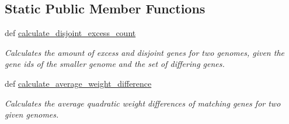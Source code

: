 \subsection*{Static Public Member Functions}
\begin{DoxyCompactItemize}
\item 
def \hyperlink{classNEAT__PyGenetics_1_1NEAT_1_1Analyst_1_1GenomeClusterer_1_1GenomeClusterer_a25f21d57d135bbf3b0f23bbfdef375e7}{calculate\+\_\+disjoint\+\_\+excess\+\_\+count}
\begin{DoxyCompactList}\small\item\em Calculates the amount of excess and disjoint genes for two genomes, given the gene ids of the smaller genome and the set of differing genes. \end{DoxyCompactList}\item 
def \hyperlink{classNEAT__PyGenetics_1_1NEAT_1_1Analyst_1_1GenomeClusterer_1_1GenomeClusterer_a748db217e8ce0c9f3e4302b00b4677e8}{calculate\+\_\+average\+\_\+weight\+\_\+difference}
\begin{DoxyCompactList}\small\item\em Calculates the average quadratic weight differences of matching genes for two given genomes. \end{DoxyCompactList}\end{DoxyCompactItemize}
